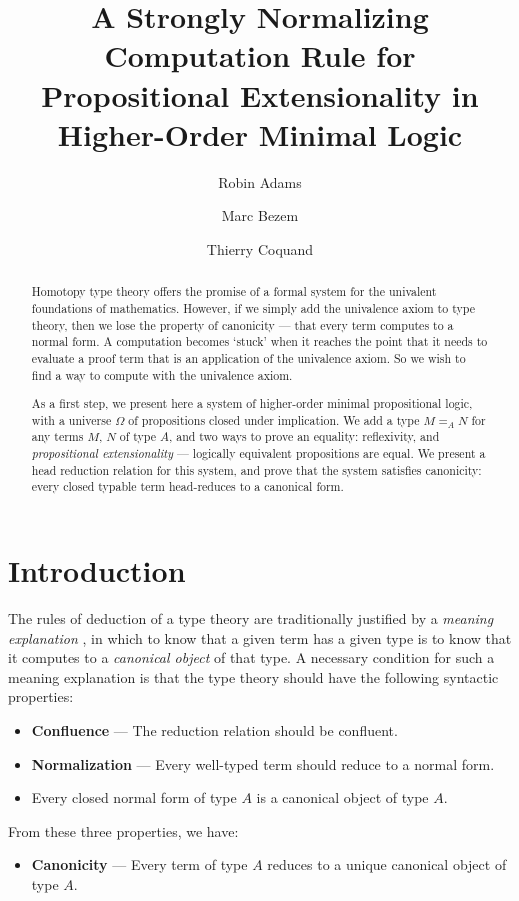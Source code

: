 \documentclass[a4paper,UKenglish]{lipics-v2016}
\title{A Strongly Normalizing Computation Rule for Propositional Extensionality in Higher-Order Minimal Logic
}
\author[1]{Robin Adams}
\author[1]{Marc Bezem}
\author[3]{Thierry Coquand}
\affil[1]{Universitetet i Bergen, Institutt for Informatikk, Postboks 7800, N-5020 BERGEN, Norway \\
  \texttt{\{robin.adams,bezem\}@ii.uib.no}}
\affil[3]{Chalmers tekniska högskola, Data- och informationsteknik, 412 96 Göteborg, Sweden \\
  \texttt{coquand@chalmers.se}}
\theoremstyle{definition}
\begin{document}
\maketitle

\begin{abstract}
 Homotopy type theory offers the promise of a formal system for the univalent foundations of mathematics. However, if we simply add the univalence axiom to type theory, then we lose the property of canonicity --- that every term computes to a normal form. A computation becomes `stuck' when it reaches the point that it needs to evaluate a proof term that is an application of the univalence axiom. So we wish to find a way to compute with the univalence axiom.

 As a first step, we present here a system of higher-order minimal propositional logic, with a universe $\Omega$ of propositions closed under implication. We add a type $M =_A N$ for any terms $M$, $N$ of type $A$, and two ways to prove an equality: reflexivity, and \emph{propositional extensionality} --- logically equivalent propositions are equal. We present a head reduction relation for this system, and prove that the system satisfies canonicity: every closed typable term head-reduces to a canonical form.
 \end{abstract}


\section{Introduction}

The rules of deduction of a type theory are traditionally justified by a \emph{meaning explanation} \cite{ML:ITT}, in which to know that a given term has a given type is to know that it computes to a \emph{canonical object} of that type.  A necessary condition for such a meaning explanation is that the type theory should have the following syntactic properties:
\begin{itemize}
\item \textbf{Confluence} --- The reduction relation should be confluent.
\item \textbf{Normalization} --- Every well-typed term should reduce to a normal form.
\item Every closed normal form of type $A$ is a canonical object of type $A$.
\end{itemize}
From these three properties, we have:
\begin{itemize}
\item \textbf{Canonicity} --- Every term of type $A$ reduces to a unique canonical object of type $A$.
\end{itemize}
\end{document}
